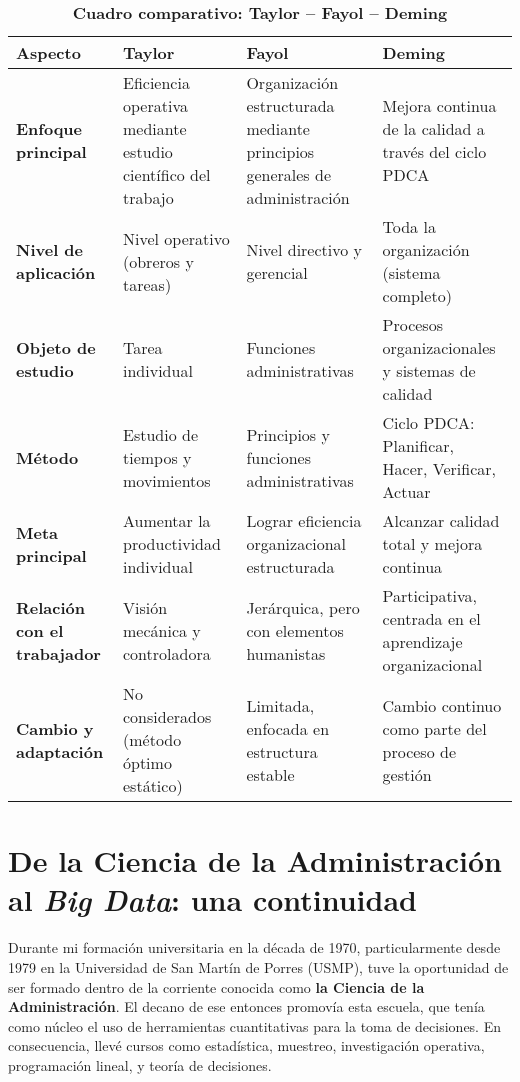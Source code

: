 \documentclass[a4paper,12pt]{article}
\begin{document}
	\begin{table}[h!]
		\centering
		\caption*{\textbf{Cuadro comparativo: Taylor – Fayol – Deming}}
		\begin{tabularx}{\textwidth}{>{\bfseries}l X X X}
			\toprule
			\textbf{Aspecto} & \textbf{Taylor} & \textbf{Fayol} & \textbf{Deming} \\
			\midrule
			Enfoque principal & Eficiencia operativa mediante estudio científico del trabajo & Organización estructurada mediante principios generales de administración & Mejora continua de la calidad a través del ciclo PDCA \\
			\addlinespace
			Nivel de aplicación & Nivel operativo (obreros y tareas) & Nivel directivo y gerencial & Toda la organización (sistema completo) \\
			\addlinespace
			Objeto de estudio & Tarea individual & Funciones administrativas & Procesos organizacionales y sistemas de calidad \\
			\addlinespace
			Método & Estudio de tiempos y movimientos & Principios y funciones administrativas & Ciclo PDCA: Planificar, Hacer, Verificar, Actuar \\
			\addlinespace
			Meta principal & Aumentar la productividad individual & Lograr eficiencia organizacional estructurada & Alcanzar calidad total y mejora continua \\
			\addlinespace
			Relación con el trabajador & Visión mecánica y controladora & Jerárquica, pero con elementos humanistas & Participativa, centrada en el aprendizaje organizacional \\
			\addlinespace
			Cambio y adaptación & No considerados (método óptimo estático) & Limitada, enfocada en estructura estable & Cambio continuo como parte del proceso de gestión \\
			\bottomrule
		\end{tabularx}
	\end{table}
	
	\section*{De la Ciencia de la Administración al \textit{Big Data}: una continuidad}
	
	Durante mi formación universitaria en la década de 1970, particularmente desde 1979 en la Universidad de San Martín de Porres (USMP), tuve la oportunidad de ser formado dentro de la corriente conocida como \textbf{la Ciencia de la Administración}. El decano de ese entonces promovía esta escuela, que tenía como núcleo el uso de herramientas cuantitativas para la toma de decisiones. En consecuencia, llevé cursos como estadística, muestreo, investigación operativa, programación lineal, y teoría de decisiones.
	
\end{document}
